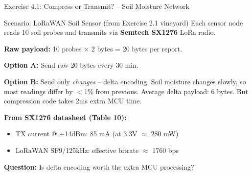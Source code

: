 \documentclass[aspectratio=169,11pt]{beamer}
\begin{document}
\begin{frame}{Exercise 4.1: Compress or Transmit? -- Soil Moisture Network}
    \begin{block}{Scenario: LoRaWAN Soil Sensor (from Exercise 2.1 vineyard)}
        Each sensor node reads 10 soil probes and transmits via \textbf{Semtech SX1276} LoRa radio.
        
        \vspace{0.2cm}
        \textbf{Raw payload:} 10 probes $\times$ 2 bytes = 20 bytes per report.
        
        \textbf{Option A:} Send raw 20 bytes every 30 min.
        
        \textbf{Option B:} Send only \textit{changes} -- delta encoding. Soil moisture changes slowly, so most readings differ by $<$1\% from previous. Average delta payload: 6 bytes. But compression code takes 2ms extra MCU time.
    \end{block}
    
    \vspace{0.2cm}
    \textbf{From SX1276 datasheet (Table 10):}
    \begin{itemize}
        \item TX current @ +14dBm: 85 mA (at 3.3V $\approx$ 280 mW)
        \item LoRaWAN SF9/125kHz: effective bitrate $\approx$ 1760 bps
    \end{itemize}
    
    \textbf{Question:} Is delta encoding worth the extra MCU processing?
\end{frame}
\end{document}
